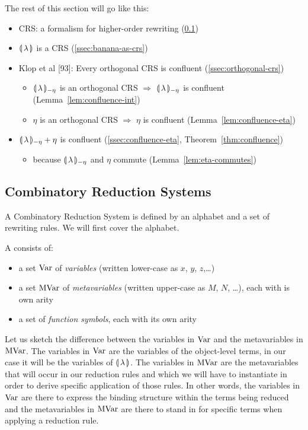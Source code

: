 The rest of this section will go like this:

\begin{itemize}
\item CRS: a formalism for higher-order rewriting (\ref{ssec:crs})
\item ${\llparenthesis \, \lambda \, \rrparenthesis}$ is a CRS (\ref{ssec:banana-as-crs})
\item Klop et al [93]: Every orthogonal CRS is confluent
  (\ref{ssec:orthogonal-crs})
  \begin{itemize}
  \item ${\llparenthesis \, \lambda \, \rrparenthesis_{-\eta}}$ is an orthogonal CRS $\Rightarrow$ ${\llparenthesis \, \lambda \, \rrparenthesis_{-\eta}}$ is confluent
    (Lemma~\ref{lem:confluence-int})
  \item $\eta$ is an orthogonal CRS $\Rightarrow$ $\eta$ is confluent
    (Lemma~\ref{lem:confluence-eta})
  \end{itemize}
\item ${\llparenthesis \, \lambda \, \rrparenthesis_{-\eta}} + \eta$ is confluent (\ref{ssec:confluence-eta},
  Theorem~\ref{thm:confluence})
  \begin{itemize}
  \item because ${\llparenthesis \, \lambda \, \rrparenthesis_{-\eta}}$ and $\eta$ commute (Lemma~\ref{lem:eta-commutes})
  \end{itemize}
\end{itemize}


\subsection{Combinatory Reduction Systems}
\label{ssec:crs}

A Combinatory Reduction System is defined by an alphabet and a set of
rewriting rules. We will first cover the alphabet.

\begin{definition}
  A  consists of:
  \begin{itemize}
  \item a set $\operatorname{Var}$ of \emph{variables} (written lower-case as $x$, $y$,
    $z$,\ldots)
  \item a set $\operatorname{MVar}$ of \emph{metavariables} (written upper-case as $M$,
    $N$, \ldots), each with is own arity
  \item a set of \emph{function symbols}, each with its own arity
  \end{itemize}
\end{definition}

Let us sketch the difference between the variables in $\operatorname{Var}$ and the
metavariables in $\operatorname{MVar}$. The variables in $\operatorname{Var}$ are the variables of the
object-level terms, in our case it will be the variables of
$\llparenthesis \, \lambda \, \rrparenthesis$. The variables in $\operatorname{MVar}$ are the metavariables that
will occur in our reduction rules and which we will have to instantiate in
order to derive specific application of those rules. In other words, the
variables in $\operatorname{Var}$ are there to express the binding structure within the
terms being reduced and the metavariables in $\operatorname{MVar}$ are there to stand in
for specific terms when applying a reduction rule.

